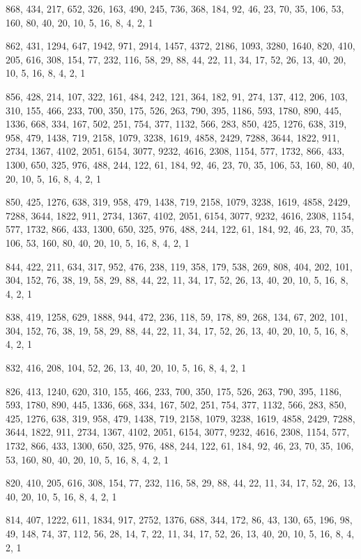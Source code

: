 \documentclass[12pt]{article}
\begin{document}
868, 434, 217, 652, 326, 163, 490, 245, 736, 368, 184, 92, 46, 23, 70, 35, 106, 53, 160, 80, 40, 20, 10, 5, 16, 8, 4, 2, 1

862, 431, 1294, 647, 1942, 971, 2914, 1457, 4372, 2186, 1093, 3280, 1640, 820, 410, 205, 616, 308, 154, 77, 232, 116, 58, 29, 88, 44, 22, 11, 34, 17, 52, 26, 13, 40, 20, 10, 5, 16, 8, 4, 2, 1

856, 428, 214, 107, 322, 161, 484, 242, 121, 364, 182, 91, 274, 137, 412, 206, 103, 310, 155, 466, 233, 700, 350, 175, 526, 263, 790, 395, 1186, 593, 1780, 890, 445, 1336, 668, 334, 167, 502, 251, 754, 377, 1132, 566, 283, 850, 425, 1276, 638, 319, 958, 479, 1438, 719, 2158, 1079, 3238, 1619, 4858, 2429, 7288, 3644, 1822, 911, 2734, 1367, 4102, 2051, 6154, 3077, 9232, 4616, 2308, 1154, 577, 1732, 866, 433, 1300, 650, 325, 976, 488, 244, 122, 61, 184, 92, 46, 23, 70, 35, 106, 53, 160, 80, 40, 20, 10, 5, 16, 8, 4, 2, 1

850, 425, 1276, 638, 319, 958, 479, 1438, 719, 2158, 1079, 3238, 1619, 4858, 2429, 7288, 3644, 1822, 911, 2734, 1367, 4102, 2051, 6154, 3077, 9232, 4616, 2308, 1154, 577, 1732, 866, 433, 1300, 650, 325, 976, 488, 244, 122, 61, 184, 92, 46, 23, 70, 35, 106, 53, 160, 80, 40, 20, 10, 5, 16, 8, 4, 2, 1

844, 422, 211, 634, 317, 952, 476, 238, 119, 358, 179, 538, 269, 808, 404, 202, 101, 304, 152, 76, 38, 19, 58, 29, 88, 44, 22, 11, 34, 17, 52, 26, 13, 40, 20, 10, 5, 16, 8, 4, 2, 1

838, 419, 1258, 629, 1888, 944, 472, 236, 118, 59, 178, 89, 268, 134, 67, 202, 101, 304, 152, 76, 38, 19, 58, 29, 88, 44, 22, 11, 34, 17, 52, 26, 13, 40, 20, 10, 5, 16, 8, 4, 2, 1

832, 416, 208, 104, 52, 26, 13, 40, 20, 10, 5, 16, 8, 4, 2, 1

826, 413, 1240, 620, 310, 155, 466, 233, 700, 350, 175, 526, 263, 790, 395, 1186, 593, 1780, 890, 445, 1336, 668, 334, 167, 502, 251, 754, 377, 1132, 566, 283, 850, 425, 1276, 638, 319, 958, 479, 1438, 719, 2158, 1079, 3238, 1619, 4858, 2429, 7288, 3644, 1822, 911, 2734, 1367, 4102, 2051, 6154, 3077, 9232, 4616, 2308, 1154, 577, 1732, 866, 433, 1300, 650, 325, 976, 488, 244, 122, 61, 184, 92, 46, 23, 70, 35, 106, 53, 160, 80, 40, 20, 10, 5, 16, 8, 4, 2, 1

820, 410, 205, 616, 308, 154, 77, 232, 116, 58, 29, 88, 44, 22, 11, 34, 17, 52, 26, 13, 40, 20, 10, 5, 16, 8, 4, 2, 1

814, 407, 1222, 611, 1834, 917, 2752, 1376, 688, 344, 172, 86, 43, 130, 65, 196, 98, 49, 148, 74, 37, 112, 56, 28, 14, 7, 22, 11, 34, 17, 52, 26, 13, 40, 20, 10, 5, 16, 8, 4, 2, 1
\end{document}
